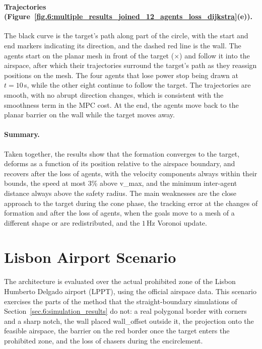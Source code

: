 \paragraph{Trajectories (Figure~\ref{fig.6:multiple_results_joined_12_agents_loss_dijkstra}(e)).}
The black curve is the target's path along part of the circle, with the start and end markers indicating its direction, and the dashed red line is the wall. The agents start on the planar mesh in front of the target ($\times$) and follow it into the airspace, after which their trajectories surround the target's path as they reassign positions on the mesh. The four agents that lose power stop being drawn at $t=10$\,s, while the other eight continue to follow the target. The trajectories are smooth, with no abrupt direction changes, which is consistent with the smoothness term in the MPC cost. At the end, the agents move back to the planar barrier on the wall while the target moves away.

\paragraph{Summary.}
Taken together, the results show that the formation converges to the target, deforms as a function of its position relative to the airspace boundary, and recovers after the loss of agents, with the velocity components always within their bounds, the speed at most 3\% above \gls{v_max}, and the minimum inter-agent distance always above the safety radius. The main weaknesses are the close approach to the target during the cone phase, the tracking error at the changes of formation and after the loss of agents, when the goals move to a mesh of a different shape or are redistributed, and the $1$\,Hz Voronoi update.

\section{Lisbon Airport Scenario} \label{sec.6:lisbon}

The architecture is evaluated over the actual prohibited zone of the Lisbon Humberto Delgado airport (LPPT), using the official airspace data. This scenario exercises the parts of the method that the straight-boundary simulations of Section~\ref{sec.6:simulation_results} do not: a real polygonal border with corners and a sharp notch, the wall placed \gls{wall_offset} outside it, the projection onto the feasible airspace, the barrier on the red border once the target enters the prohibited zone, and the loss of chasers during the encirclement.

